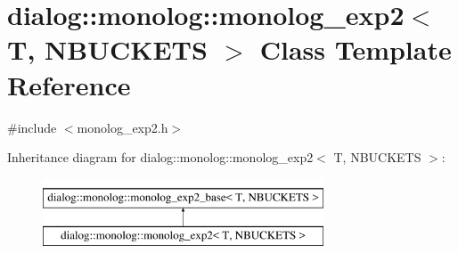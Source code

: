 \hypertarget{classdialog_1_1monolog_1_1monolog__exp2}{}\section{dialog\+:\+:monolog\+:\+:monolog\+\_\+exp2$<$ T, N\+B\+U\+C\+K\+E\+TS $>$ Class Template Reference}
\label{classdialog_1_1monolog_1_1monolog__exp2}


{\ttfamily \#include $<$monolog\+\_\+exp2.\+h$>$}

Inheritance diagram for dialog\+:\+:monolog\+:\+:monolog\+\_\+exp2$<$ T, N\+B\+U\+C\+K\+E\+TS $>$\+:\begin{figure}[H]
\begin{center}
\leavevmode
\includegraphics[height=2.000000cm]{classdialog_1_1monolog_1_1monolog__exp2}
\end{center}
\end{figure}
